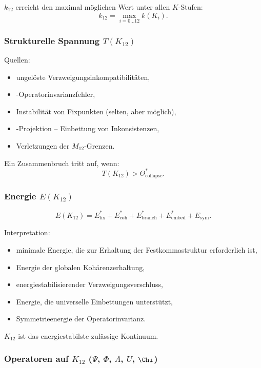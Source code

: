 $k_{12}$ erreicht den maximal möglichen Wert unter allen $K$-Stufen:
\[
k_{12} = \max_{i=0\dots12} k(K_i).
\]

\subsubsection{Strukturelle Spannung $T(K_{12})$}

Quellen:
\begin{itemize}
    \item ungelöste Verzweigungsinkompatibilitäten,
    \item-Operatorinvarianzfehler,
    \item Instabilität von Fixpunkten (selten, aber möglich),
    \item-Projektion – Einbettung von Inkonsistenzen,
    \item Verletzungen der $M_{12}$-Grenzen.
\end{itemize}

Ein Zusammenbruch tritt auf, wenn:
\[
T(K_{12}) > \Theta^*_{\mathrm{collapse}}.
\]

\subsubsection{Energie $E(K_{12})$}

\[
E(K_{12}) =
E_{\mathrm{fix}}^*
+E_{\mathrm{coh}}^*
+E_{\mathrm{branch}}^*
+E_{\mathrm{embed}}^*
+E_{\mathrm{sym}}.
\]

Interpretation:
\begin{itemize}
    \item minimale Energie, die zur Erhaltung der Festkommastruktur erforderlich ist,
    \item Energie der globalen Kohärenzerhaltung,
    \item energiestabilisierender Verzweigungsverschluss,
    \item Energie, die universelle Einbettungen unterstützt,
    \item Symmetrieenergie der Operatorinvarianz.
\end{itemize}

$K_{12}$ ist das energiestabilste zulässige Kontinuum.

\subsubsection{Operatoren auf $K_{12}$ ($\Psi$, $\Phi$, $\Lambda$, $U$, $\Chi$)}

